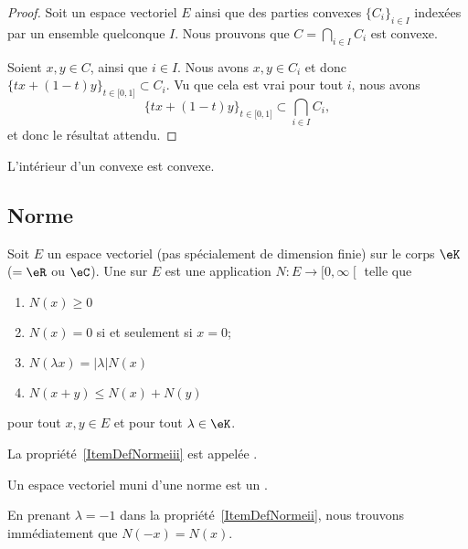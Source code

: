\begin{proof}
	Soit un espace vectoriel \( E\) ainsi que des parties convexes \( \{  C_i \}_{i\in I}\) indexées par un ensemble quelconque \( I\). Nous prouvons que \( C= \bigcap_{i\in I}C_i\) est convexe.

	Soient \( x, y\in C\), ainsi que \( i\in I\). Nous avons \( x,y\in C_i\) et donc \( \{ tx+(1-t)y \}_{t\in \mathopen[ 0 , 1 \mathclose]}\subset C_i\). Vu que cela est vrai pour tout \( i\), nous avons
	\begin{equation}
		\{ tx+(1-t)y \}_{t\in \mathopen[ 0 , 1 \mathclose]}\subset \bigcap_{i\in I}C_i,
	\end{equation}
	et donc le résultat attendu.
\end{proof}

\begin{lemma}		\label{LEMooEFCCooOuStrb}
	L'intérieur d'un convexe est convexe.
\end{lemma}

\ssdem

\subsection{Norme}

\begin{definition}  \label{DefNorme}
	Soit \( E\) un espace vectoriel (pas spécialement de dimension finie) sur le corps \( \eK\) (\( =\eR\) ou \( \eC\)). Une   sur \( E\) est une application \( N\colon E\to\mathopen[ 0 , \infty \mathclose[\) telle que
	\begin{enumerate}
		\item
		      \( N(x)\geq 0\)
		\item
		      \( N(x)=0\) si et seulement si \( x=0\);
		      \item\label{ItemDefNormeii}
		      \( N(\lambda x)=| \lambda |N(x)\)
		      \item\label{ItemDefNormeiii}
		      \( N(x+y)\leq N(x)+N(y)\)
	\end{enumerate}
	pour tout \( x,y\in E\) et pour tout \( \lambda\in\eK\).

	La propriété~\ref{ItemDefNormeiii} est appelée .

	Un espace vectoriel muni d'une norme est un .
\end{definition}
En prenant \( \lambda=-1\) dans la propriété~\ref{ItemDefNormeii}, nous trouvons immédiatement que \( N(-x)=N(x)\).

